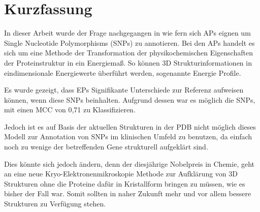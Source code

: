 
\chapter{Kurzfassung}

In dieser Arbeit wurde der Frage nachgegangen in wie fern sich \acf{APs} eignen um Single Nucleotide Polymorphisms (SNPs) zu annotieren. Bei den \ac{APs} handelt es sich um eine Methode der Transformation der physikochemischen Eigenschaften der Proteinstruktur in ein Energiemaß. So können 3D Strukturinformationen in eindimensionale Energiewerte überführt werden, sogenannte Energie Profile.

Es wurde gezeigt, dass \ac{EP}s Signifikante Unterschiede zur Referenz aufweisen können, wenn diese SNPs beinhalten. Aufgrund dessen war es möglich die \ac{SNP}s, mit einen \ac{MCC} von 0,71 zu Klassifizieren.

Jedoch ist es auf Basis der aktuellen Strukturen in der \ac{PDB} nicht möglich dieses Modell zur Annotation von \ac{SNP}s im klinischen Umfeld zu benutzen, da einfach noch zu wenige der betreffenden Gene strukturell aufgeklärt sind.

Dies könnte sich jedoch ändern, denn der diesjährige Nobelpreis in Chemie, geht an eine neue Kryo-Elektronenmikroskopie Methode zur Aufklärung von 3D Strukturen ohne die Proteine dafür in Kristallform bringen zu müssen, wie es bisher der Fall war. Somit sollten in naher Zukunft mehr und vor allem bessere Strukturen zu Verfügung stehen.

